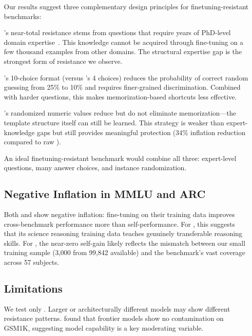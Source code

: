 Our results suggest three complementary design principles for finetuning-resistant benchmarks:

 \gpqa's near-total resistance stems from questions that require years of PhD-level domain expertise~\citep{rein2023gpqa}. This knowledge cannot be acquired through fine-tuning on a few thousand examples from other domains. The structural expertise gap is the strongest form of resistance we observe.

 \mmlupro's 10-choice format (versus \mmlu's 4 choices) reduces the probability of correct random guessing from 25\% to 10\% and requires finer-grained discrimination. Combined with harder questions, this makes memorization-based shortcuts less effective.

 \gsmsym's randomized numeric values reduce but do not eliminate memorization---the template structure itself can still be learned. This strategy is weaker than expert-knowledge gaps but still provides meaningful protection (34\% inflation reduction compared to raw \gsmk).

An ideal finetuning-resistant benchmark would combine all three: expert-level questions, many answer choices, and instance randomization.

\subsection{Negative Inflation in MMLU and ARC}
\label{sec:negative_inflation}

Both \mmlu and \arc show negative inflation: fine-tuning on their training data improves cross-benchmark performance more than self-performance. For \arc, this suggests that its science reasoning training data teaches genuinely transferable reasoning skills. For \mmlu, the near-zero self-gain likely reflects the mismatch between our small training sample (3{,}000 from 99{,}842 available) and the benchmark's vast coverage across 57 subjects.

\subsection{Limitations}
\label{sec:limitations}

 We test only \qwen. Larger or architecturally different models may show different resistance patterns. \citet{zhang2024gsm1k} found that frontier models show no contamination on GSM1K, suggesting model capability is a key moderating variable.

